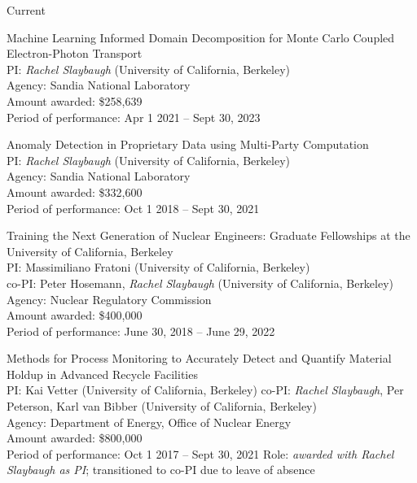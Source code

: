 \begin{rSubsection}{Current}{}{}{}
\item Machine Learning Informed Domain Decomposition for Monte Carlo Coupled Electron-Photon Transport	\\
PI: \textit{Rachel Slaybaugh} (University of California, Berkeley)\\
Agency: Sandia National Laboratory \\
Amount awarded: \$258,639\\
Period of performance: Apr 1 2021 -- Sept 30, 2023

\vspace*{0.3 em}
\item Anomaly Detection in Proprietary Data using Multi-Party Computation	\\
PI: \textit{Rachel Slaybaugh} (University of California, Berkeley)\\
Agency: Sandia National Laboratory \\
Amount awarded: \$332,600\\
Period of performance: Oct 1 2018 -- Sept 30, 2021

\vspace*{0.3 em}
\item Training the Next Generation of Nuclear Engineers: Graduate Fellowships at the University of California, Berkeley	\\
PI: Massimiliano Fratoni (University of California, Berkeley) \\
\hspace*{1 em} co-PI: Peter Hosemann, \textit{Rachel Slaybaugh} (University of California, Berkeley)\\
Agency: Nuclear Regulatory Commission \\
Amount awarded: \$400,000\\
Period of performance: June 30, 2018 -- June 29, 2022

\vspace*{0.3 em}
\item Methods for Process Monitoring to Accurately Detect and Quantify Material Holdup in Advanced Recycle Facilities	\\
PI: Kai Vetter (University of California, Berkeley)
\hspace*{1 em} co-PI: \textit{Rachel Slaybaugh}, Per Peterson, Karl van Bibber (University of California, Berkeley)\\
Agency: Department of Energy, Office of Nuclear Energy \\
Amount awarded: \$800,000\\
Period of performance: Oct 1 2017 -- Sept 30, 2021
Role: \textit{awarded with Rachel Slaybaugh as PI}; transitioned to co-PI due to leave of absence


\end{rSubsection}

